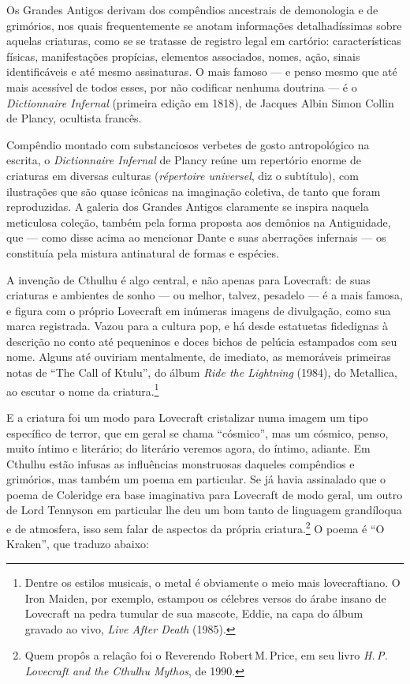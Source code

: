 Os Grandes Antigos derivam dos compêndios ancestrais de demonologia e de
grimórios, nos quais frequentemente se anotam informações detalhadíssimas
sobre aquelas criaturas, como se se tratasse de registro legal em
cartório: características físicas, manifestações propícias, elementos
associados, nomes, ação, sinais identificáveis e até mesmo assinaturas.
O mais famoso --- e penso mesmo que até mais acessível de todos esses,
por não codificar nenhuma doutrina --- é o \emph{Dictionnaire Infernal}
(primeira edição em 1818), de Jacques Albin Simon Collin de Plancy, ocultista francês.

Compêndio montado com substanciosos verbetes de gosto antropológico na
escrita, o \emph{Dictionnaire Infernal} de Plancy reúne um repertório
enorme de criaturas em diversas culturas (\emph{répertoire universel},
diz o subtítulo), com ilustrações que são quase icônicas na imaginação
coletiva, de tanto que foram reproduzidas. A galeria dos Grandes Antigos
claramente se inspira naquela meticulosa coleção, também pela forma
proposta aos demônios na Antiguidade, que --- como disse acima ao
mencionar Dante e suas aberrações infernais --- os constituía pela
mistura antinatural de formas e espécies.

A invenção de Cthulhu é algo central, e não apenas para Lovecraft: de
suas criaturas e ambientes de sonho --- ou melhor, talvez, pesadelo
--- é a mais famosa, e figura com o próprio Lovecraft em inúmeras
imagens de divulgação, como sua marca registrada. Vazou para a cultura
pop, e há desde estatuetas fidedignas à descrição no conto até
pequeninos e doces bichos de pelúcia estampados com seu nome. Alguns até
ouviriam mentalmente, de imediato, as memoráveis primeiras notas de
``The Call of Ktulu'', do álbum \emph{Ride the Lightning} (1984), do
Metallica, ao escutar o nome da criatura.\footnote{Dentre os estilos
  musicais, o metal é obviamente o meio mais lovecraftiano. O Iron
  Maiden, por exemplo, estampou os célebres versos do árabe insano de
  Lovecraft na pedra tumular de sua mascote, Eddie, na capa do álbum
  gravado ao vivo, \emph{Live After Death} (1985).}

E a criatura foi um modo para Lovecraft cristalizar numa imagem um tipo
específico de terror, que em geral se chama ``cósmico'', mas um cósmico,
penso, muito íntimo e literário; do literário veremos agora, do íntimo,
adiante. Em Cthulhu estão infusas as influências monstruosas daqueles
compêndios e grimórios, mas também um poema em particular. Se já havia
assinalado que o poema de Coleridge era base imaginativa para Lovecraft
de modo geral, um outro de Lord Tennyson em particular lhe
deu um bom tanto de linguagem grandíloqua e de atmosfera, isso sem falar de
aspectos da própria criatura.\footnote{Quem propôs a relação foi o
  Reverendo Robert\,M.\,Price, em seu livro \emph{H.\,P.\,Lovecraft and the
  Cthulhu Mythos}, de 1990.} O poema é ``O Kraken'', que traduzo
abaixo:

